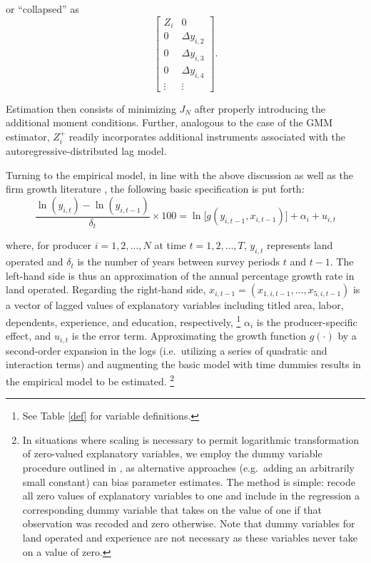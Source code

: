 \documentclass[english]{article}
\begin{document}
\noindent
or ``collapsed'' as
\begin{equation}
\left[ 
\begin{array}{ccccccc}
Z_i  & 0  \\
0 & \Delta y_{i,2}  \\
0 & \Delta y_{i,3}  \\
0 & \Delta y_{i,4}  \\
\vdots & \vdots 
\end{array}
\right].
\label{zcnew}
\end{equation}

\noindent
Estimation then consists of minimizing $J_N$ after properly introducing the 
additional moment conditions. 
Further, analogous to the case of the \citeauthor{arellano1991} GMM 
estimator, $Z_{i}^{+}$ readily incorporates additional instruments 
associated with the autoregressive-distributed lag model.

Turning to the empirical model, in line with the above discussion as well as 
the firm growth literature
\citep{evans1987, sleuwaegen2002, rizov2003, dries2004b}, the following 
basic specification is put forth:
\begin{equation}
\frac{\ln (y_{i,t}) - \ln(y_{i,t-1})}{\delta_t} \times 100 = \ln 
\big[g(y_{i,t-1}, x_{i,t-1})\big] + \alpha_i + u_{i,t}
\label{emodel}
\end{equation}

\noindent
where, for producer $i=1,2,\ldots,N$ at time $t=1,2,\ldots,T$, $y_{i,t}$
represents land operated and $\delta_t$ is the number of years between 
survey periods $t$ and $t-1$. 
The left-hand side is thus an approximation of the annual percentage growth 
rate in land operated. 
Regarding the right-hand side, $x_{i,t-1} = (x_{1,i,t-1}, \ldots, x_{5,i,t-1} )$ 
is a vector of lagged values of explanatory variables including titled area, 
labor, dependents, experience, and education, respectively,%
\footnote{See Table \ref{def} for variable definitions.} 
$\alpha_i$ is the producer-specific effect, and $u_{i,t}$ is the error term. 
Approximating the growth function $g(\cdot)$ by a second-order expansion 
in the logs (i.e.\ utilizing a series of quadratic and interaction terms) and 
augmenting the basic model with time dummies results in the empirical 
model to be estimated.%
\footnote{\label{note: zvdum}In situations where scaling is necessary to 
permit logarithmic transformation of zero-valued explanatory variables, 
we employ the dummy variable procedure outlined in \citet{battese1997}, 
as alternative approaches (e.g.\ adding an arbitrarily small constant) can bias 
parameter estimates.
The method is simple: recode all zero values of explanatory variables to one 
and include in the regression a corresponding dummy variable that takes on 
the value of one if that observation was recoded and zero otherwise. 
Note that dummy variables for land operated and experience are not 
necessary as these variables never take on a value of zero.}
\end{document}
